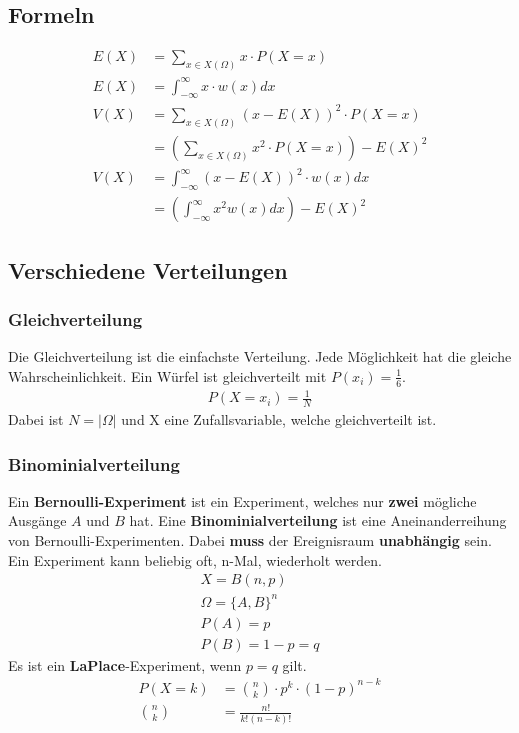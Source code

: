 \documentclass[a4paper, 11pt]{article}
\begin{document}
\begin{multicols}{3}
\begin{small}
	    \subsection{Formeln}
		    \begin{align*}
		    	E(X) &= \sum_{x \in X(\Omega)} x \cdot P(X = x)\\
		    	E(X) &= \int_{-\infty}^{\infty} x \cdot w(x) dx\\
		    	V(X) &= \sum_{x \in X(\Omega)} (x - E(X))^2 \cdot P(X = x)\\
		    		 &= \left(\sum_{x \in X(\Omega)} x^2 \cdot P(X = x)\right) - E(X)^2\\
		    	V(X) &= \int_{-\infty}^{\infty} (x - E(X))^2 \cdot w(x) dx\\
		    		 &= \left(\int_{-\infty}^{\infty} x^2 w(x) dx \right) - E(X)^2	 
		    \end{align*}
	    \subsection{Verschiedene Verteilungen}
		   \subsubsection{Gleichverteilung}	
			   Die Gleichverteilung ist die einfachste Verteilung. Jede Möglichkeit hat die gleiche Wahrscheinlichkeit. Ein Würfel ist gleichverteilt mit $P(x_i) = \frac{1}{6}$.\\
			   \begin{align*}
			   P(X = x_i) = \frac{1}{N}
			   \end{align*}
			   Dabei ist $N = |\Omega|$ und X eine Zufallsvariable, welche gleichverteilt ist.
	    	\subsubsection{Binominialverteilung}
			    Ein \textbf{Bernoulli-Experiment} ist ein Experiment, welches nur \textbf{zwei} mögliche Ausgänge $A$ und $B$ hat. Eine \textbf{Binominialverteilung} ist eine Aneinanderreihung von Bernoulli-Experimenten. Dabei \textbf{muss} der Ereignisraum \textbf{unabhängig} sein. Ein Experiment kann beliebig oft, n-Mal, wiederholt werden.
				    \begin{align*}
				    X = B(n, p)\\
				    \Omega = \{A, B\}^n\\
				    P(A) = p\\
				    P(B) = 1 - p = q
				    \end{align*}
	    		Es ist ein \textbf{LaPlace}-Experiment, wenn $p = q$ gilt.
			    \begin{align*}
			    P(X = k) &= {n \choose k} \cdot p^k \cdot (1-p)^{n-k}\\
			    {n \choose k} &= \frac{n!}{k! (n-k)!}
			    \end{align*}

\end{small}
\end{multicols}
\end{document}
